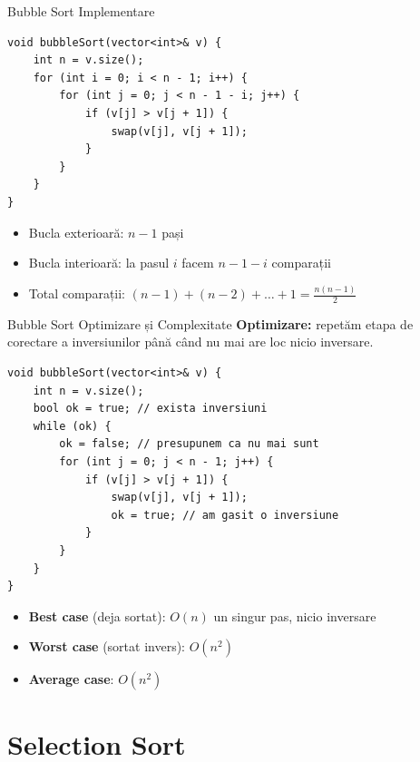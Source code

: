 ﻿\documentclass{beamer}
\begin{document}
\begin{frame}[fragile]{Bubble Sort \textemdash{} Implementare}
  \begin{lstlisting}
void bubbleSort(vector<int>& v) {
    int n = v.size();
    for (int i = 0; i < n - 1; i++) {
        for (int j = 0; j < n - 1 - i; j++) {
            if (v[j] > v[j + 1]) {
                swap(v[j], v[j + 1]);
            }
        }
    }
}
  \end{lstlisting}
  \begin{itemize}
    \item Bucla exterioară: $n-1$ pași
    \item Bucla interioară: la pasul $i$ facem $n-1-i$ comparații
    \item Total comparații: $(n-1) + (n-2) + \ldots + 1 = \frac{n(n-1)}{2}$
  \end{itemize}
\end{frame}

\begin{frame}{Bubble Sort \textemdash{} Optimizare și Complexitate}
  \textbf{Optimizare:} repetăm etapa de corectare a inversiunilor până când nu mai are loc nicio inversare.
  \begin{lstlisting}
void bubbleSort(vector<int>& v) {
    int n = v.size();
    bool ok = true; // exista inversiuni
    while (ok) {
        ok = false; // presupunem ca nu mai sunt
        for (int j = 0; j < n - 1; j++) {
            if (v[j] > v[j + 1]) {
                swap(v[j], v[j + 1]);
                ok = true; // am gasit o inversiune
            }
        }
    }
}
  \end{lstlisting}
  \begin{itemize}
    \item \textbf{Best case} (deja sortat): $O(n)$ \textemdash{} un singur pas, nicio inversare
    \item \textbf{Worst case} (sortat invers): $O(n^2)$
    \item \textbf{Average case}: $O(n^2)$
  \end{itemize}
\end{frame}

\section{Selection Sort}
\end{document}
